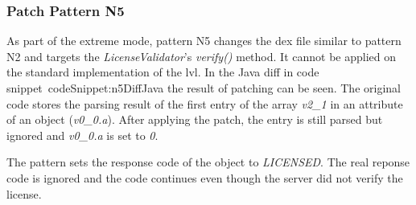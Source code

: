 \subsubsection{Patch Pattern N5}
As part of the extreme mode, pattern N5 changes the \gls{dex} file similar to pattern N2 and targets the \textit{LicenseValidator}'s \textit{verify()} method.
It cannot be applied on the standard implementation of the \gls{lvl}.
\newline
In the Java diff in code snippet~{codeSnippet:n5DiffJava} the result of patching can be seen.
The original code stores the parsing result of the first entry of the array \textit{v2\_1} in an attribute of an object (\textit{v0\_0.a}).
After applying the patch, the entry is still parsed but ignored and \textit{v0\_0.a} is set to \textit{0}.
\newline

The pattern sets the response code of the object to \textit{LICENSED}.
The real reponse code is ignored and the code continues even though the server did not verify the license.


